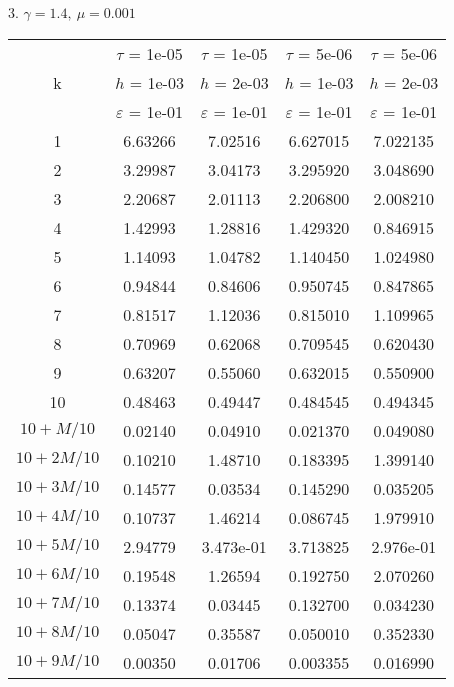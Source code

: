 3. $\gamma = 1.4, \ \mu = 0.001$
\begin{center}
	\begin{tabular}{ |c|c|c|c|c| } 
		\hline
		& $\tau$ = 1e-05 & $\tau$ = 1e-05 & $\tau$ = 5e-06 & $\tau$ = 5e-06 \\ 
		k & $h$ = 1e-03 & $h$ = 2e-03 & $h$ = 1e-03 & $h$ = 2e-03 \\ 
		& $\varepsilon$ = 1e-01 & $\varepsilon$ = 1e-01 & $\varepsilon$ = 1e-01 & $\varepsilon$ = 1e-01 \\ 
		\hline
		1 & 6.63266 & 7.02516 & 6.627015 & 7.022135 \\
		\hline
		2 & 3.29987 & 3.04173 & 3.295920 & 3.048690 \\
		\hline
		3 & 2.20687 & 2.01113 & 2.206800 & 2.008210 \\
		\hline
		4 & 1.42993 & 1.28816 & 1.429320 & 0.846915 \\
		\hline
		5 & 1.14093 & 1.04782 & 1.140450 & 1.024980 \\
		\hline
		6 & 0.94844 & 0.84606 & 0.950745 & 0.847865 \\
		\hline
		7 & 0.81517 & 1.12036 & 0.815010 & 1.109965 \\
		\hline
		8 & 0.70969 & 0.62068 & 0.709545 & 0.620430 \\
		\hline
		9 & 0.63207 & 0.55060 & 0.632015 & 0.550900 \\
		\hline
		10 & 0.48463 & 0.49447 & 0.484545 & 0.494345 \\
		\hline
		$10 + M/10$ & 0.02140 & 0.04910 & 0.021370 & 0.049080 \\
		\hline
		$10 + 2M/10$ & 0.10210 & 1.48710 & 0.183395 & 1.399140 \\
		\hline
		$10 + 3M/10$ & 0.14577 & 0.03534 & 0.145290 & 0.035205 \\
		\hline
		$10 + 4M/10$ & 0.10737 & 1.46214 & 0.086745 & 1.979910 \\
		\hline
		$10 + 5M/10$ & 2.94779 & 3.473e-01 & 3.713825 & 2.976e-01 \\
		\hline
		$10 + 6M/10$ & 0.19548 & 1.26594 & 0.192750 & 2.070260 \\
		\hline
		$10 + 7M/10$ & 0.13374 & 0.03445 & 0.132700 & 0.034230 \\
		\hline
		$10 + 8M/10$ & 0.05047 & 0.35587 & 0.050010 & 0.352330 \\
		\hline
		$10 + 9M/10$ & 0.00350 & 0.01706 & 0.003355 & 0.016990 \\
		\hline
	\end{tabular}
\end{center}
